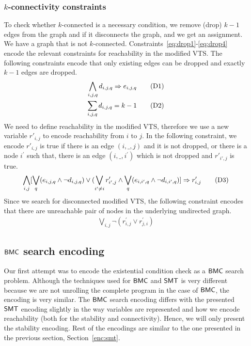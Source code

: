 \subsubsection{$k$-connectivity constraints}
To check whether $k$-connected is a necessary condition, we remove (drop) $k-1$ edges from the graph and if it
disconnects the graph, and we get an assignment. We have a graph that is not  $k$-connected.
%
Constraints~\ref{eq:drop1}-\ref{eq:drop4}
encode the relevant constraints for reachability
in the modified VTS. 
%
The following constraints encode that only
existing edges can be dropped and exactly $k-1$ edges are dropped.
\begin{align}
  \bigwedge\limits_{i,j,q} d_{i,j,q} \Rightarrow e_{i,j,q}  \tag{D1}\label{eq:drop1}\\
  \sum_{i,j,q} d_{i,j,q} = k-1
  \tag{D2}\label{eq:drop2}
\end{align}
We need to define reachability in the modified VTS, therefore we use
a new variable $r'_{i,j}$ to encode reachability from $i$ to $j$.
In the following constraint, we encode $r'_{i,j}$ is true if there is an
edge $(i,\_,j)$ and it is not dropped, or there is a node
$i^{\prime}$ such that, there is an edge $(i,\_,i^{\prime})$ which is
not dropped and $r'_{i',j}$ is true.
\begin{align}
\bigwedge\limits_{i,j}  [\bigvee_{q} (e_{i,j,q} \land  \neg d_{i,j,q}) \lor  (\bigvee_{i' \neq i}  r^{\prime}_{i',j} \land  \bigvee_{q} (e_{i,i',q} \land \neg d_{i,i',q}) ] \Rightarrow r^{\prime}_{i,j}  
  \tag{D3}\label{eq:drop3}
\end{align}
Since we search for disconnected modified VTS,
the following constraint encodes that there are 
unreachable pair of nodes in the underlying undirected graph.
\begin{align}
   \bigvee\limits_{i,j} \neg (r^{\prime}_{i,j} \lor r^{\prime}_{j,i})
  \tag{D4}\label{eq:drop4}
\end{align}



\subsection{$\mathsf{BMC}$ search encoding}

Our first attempt was to encode the existential condition check as a $\mathsf{BMC}$ search problem.
%
%
Although the techniques used for $\mathsf{BMC}$ and $\mathsf{SMT}$ is very different because we are not unrolling the complete program in the case of $\mathsf{BMC}$, the encoding is very similar.
% 
The $\mathsf{BMC}$ search encoding differs with the presented $\mathsf{SMT}$ encoding slightly in the way variables are represented and how we encode reachability (both for the stability and connectivity).  
%
Hence, we will only present the stability encoding.  
%
Rest of the encodings are similar to the one presented in the previous section, Section~\ref{enc:smt}.


